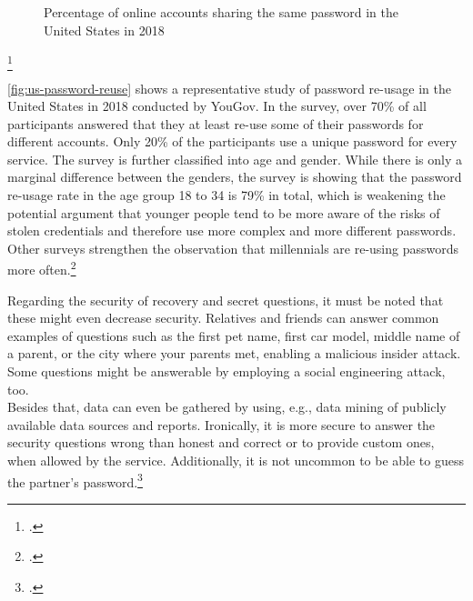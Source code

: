 \begin{figure}[h]
	\begin{bchart}[min=5, max=55, step=10, unit=\%, scale=1.2]
		\medskip
		\medskip
		\bigskip
		\bigskip
	\end{bchart}
	\caption[Percentage of online accounts sharing the same password in the United States in 2018]{Percentage of online accounts sharing the same password in the United States in 2018\footnotemark}
	\label{fig:us-password-reuse}
\end{figure}
\footcitetext[Source:][8]{yougov}

\autoref{fig:us-password-reuse} shows a representative study of password re-usage in the United States in 2018 conducted by YouGov. In the survey, over 70\% of all participants answered that they at least re-use some of their passwords for different accounts. Only 20\% of the participants use a unique password for every service. The survey is further classified into age and gender. While there is only a marginal difference between the genders, the survey is showing that the password re-usage rate in the age group 18 to 34 is 79\% in total, which is weakening the potential argument that younger people tend to be more aware of the risks of stolen credentials and therefore use more complex and more different passwords. Other surveys strengthen the observation that millennials are re-using passwords more often.\footcites[See][10]{ibm-security}[See][8]{yougov}[See][11]{lastpass}[See][1429]{Thomas:2017:DBP:3133956.3134067}

Regarding the security of recovery and secret questions, it must be noted that these might even decrease security. Relatives and friends can answer common examples of questions such as \frqq the first pet name, first car model, middle name of a parent, or the city where your parents met\flqq{}, enabling a malicious insider attack. Some questions might be answerable by employing a social engineering attack, too.\\
Besides that, data can even be gathered by using, e.g., data mining of publicly available data sources and reports. Ironically, it is more secure to answer the security questions wrong than honest and correct or to provide custom ones, when allowed by the service. Additionally, it is not uncommon to be able to guess the partner's password.\footcites[See][11]{lastpass}[See][169]{Brainard2006}[See][]{Bonneau:2015:SLA:2736277.2741691}[See][5--6]{Rabkin:2008:PKQ:1408664.1408667}[See][386]{5207657}

